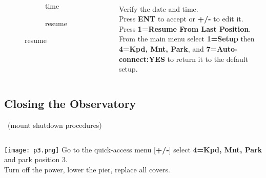 \begin{frame}[t]{\insertsubsectionhead}
    \begin{columns}[T]

      \begin{figure}[ht]
          \begin{subfigure}{0.67\textwidth}
          \caption{time}
        \end{subfigure}
        \vspace{\fill}
        \begin{subfigure}{0.67\textwidth}
          \caption{resume}
        \end{subfigure}
      \end{figure}
    \large
    \ \\[0.25ex]
    Verify the date and time.\\[1ex]

    Press \textbf{ENT} to accept or \textbf{+/-} to edit it.\\[1ex]

    Press \textbf{1=Resume From Last Position}.\\[1ex]

    From the main menu select \textbf{1=Setup} then \textbf{4=Kpd, Mnt, Park},
    and \textbf{7=Auto-connect:YES} to return it to the default setup.

  \end{columns}
\end{frame}


\subsection{Closing the Observatory}

\begin{frame}[t]{\insertsubsectionhead\ (mount shutdown procedures)}
  \begin{columns}[T]
      \centering
      \texttt{[image: p3.png]}
    \large
    Go to the quick-access menu [\textbf{+/-}] select \textbf{4=Kpd, Mnt,
    Park} and park position 3.\\[1ex]

    Turn off the power, lower the pier, replace all covers.

  \end{columns}
\end{frame}

